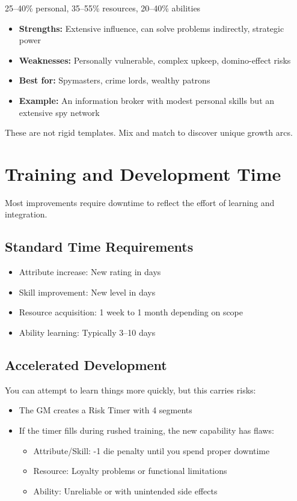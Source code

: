 \documentclass[11pt,twoside,openany]{book}
\begin{document}
25--40\% personal, 35--55\% resources, 20--40\% abilities
\begin{itemize}
\item \textbf{Strengths:} Extensive influence, can solve problems indirectly, strategic power
\item \textbf{Weaknesses:} Personally vulnerable, complex upkeep, domino-effect risks
\item \textbf{Best for:} Spymasters, crime lords, wealthy patrons
\item \textbf{Example:} An information broker with modest personal skills but an extensive spy network
\end{itemize}

\begin{tcolorbox}[colback=gray!5!white, colframe=gray!75!black, title=Player Note, fonttitle=\bfseries,breakable]
These are not rigid templates. Mix and match to discover unique growth arcs.
\end{tcolorbox}

\section*{Training and Development Time} 

Most improvements require downtime to reflect the effort of learning and integration.

\subsection*{Standard Time Requirements}

\begin{itemize}
\item Attribute increase: New rating in days
\item Skill improvement: New level in days
\item Resource acquisition: 1 week to 1 month depending on scope
\item Ability learning: Typically 3--10 days
\end{itemize}

\subsection*{Accelerated Development}

You can attempt to learn things more quickly, but this carries risks:
\begin{itemize}
\item The GM creates a Risk Timer with 4 segments
\item If the timer fills during rushed training, the new capability has flaws:
\begin{itemize}
\item Attribute/Skill: -1 die penalty until you spend proper downtime
\item Resource: Loyalty problems or functional limitations
\item Ability: Unreliable or with unintended side effects
\end{itemize}
\end{itemize}
\end{document}
